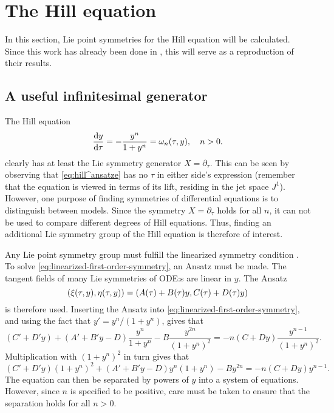 \section{The Hill equation}

In this section, Lie point symmetries for the Hill equation will be calculated.
Since this work has already been done in \cite{ohlsson2020symmetry}, this will serve as a reproduction of their results.

\subsection{A useful infinitesimal generator}

The Hill equation
\begin{equation} \label{eq:hill^ansatze}
  \diff{y}{\tau} = - \frac{y^n}{1 + y^n} = \omega_n(\tau, y), \quad
  n > 0.
\end{equation}
clearly has at least the Lie symmetry generator \(X=\partial_\tau\).
This can be seen by observing that \cref{eq:hill^ansatze} has no \(\tau\) in either side's expression (remember that the equation is viewed in terms of its lift, residing in the jet space \(J^1\)).
However, one purpose of finding symmetries of differential equations is to distinguish between models.
Since the symmetry \(X=\partial_\tau\) holds for all \(n\), it can not be used to compare different degrees of Hill equations.
Thus, finding an additional Lie symmetry group of the Hill equation is therefore of interest.

Any Lie point symmetry group must fulfill the linearized symmetry condition .
To solve \cref{eq:linearized-first-order-symmetry}, an Ansatz must be made.
The tangent fields of many Lie symmetries of ODE:s are linear in \(y\).
The Ansatz
\begin{equation}
  \pqty{\xi(\tau,y),\eta(\tau,y)} = \pqty{A(\tau) + B(\tau)y,C(\tau) + D(\tau)y}
\end{equation}
is therefore used.
Inserting the Ansatz into \cref{eq:linearized-first-order-symmetry}, and using the fact that \(y' = y^n / (1 + y^n)\), gives that
\begin{equation}
  (C' + D'y) + (A' + B'y - D) \frac{y^n}{1 + y^n} - B \frac{y^{2n}}{(1 + y^n)^2} =
  -n(C + Dy) \frac{y^{n-1}}{(1 + y^n)^2}.
\end{equation}
Multiplication with \((1 + y^n)^2\) in turn gives that
\begin{equation} \label{eq:hill-linear-symmetry}
  (C' + D'y)(1 + y^n)^2 + (A' + B'y - D)y^n(1 + y^n) - By^{2n} =
  -n(C + Dy) y^{n-1}.
\end{equation}
The equation can then be separated by powers of \(y\) into a system of equations.
However, since \(n\) is specified to be positive, care must be taken to ensure that the separation holds for all \(n>0\).

